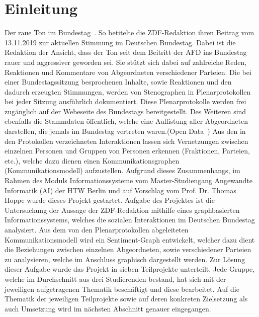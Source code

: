\section{Einleitung}\label{sec:01_01_einleitung}
\glqq Der raue Ton im Bundestag\grqq{}~\cite{TonImBundesTag2019}. So betitelte die ZDF-Redaktion ihren Beitrag vom 13.11.2019 zur aktuellen Stimmung im Deutschen Bundestag. Dabei ist die Redaktion der Ansicht, dass der Ton seit dem Beitritt der AFD ins Bundestag rauer und aggressiver geworden sei. Sie stützt sich dabei auf zahlreiche Reden, Reaktionen und Kommentare von Abgeordneten verschiedener Parteien. Die bei einer Bundestagssitzung besprochenen Inhalte, sowie Reaktionen und den dadurch erzeugten Stimmungen, werden von Stenographen in Plenarprotokollen bei jeder Sitzung ausführlich dokumentiert. Diese Plenarprotokolle werden frei zugänglich auf der Webeseite des Bundestags bereitgestellt. Des Weiteren sind ebenfalls die Stammdaten öffentlich, welche eine Auflistung aller Abgeordneten darstellen, die jemals im Bundestag vertreten waren.(Open Data~\cite{OpenData2019}) Aus den in den Protokollen verzeichneten Interaktionen lassen sich Vernetzungen zwischen einzelnen Personen und Gruppen von Personen erkennen (Fraktionen, Parteien, etc.), welche dazu dienen einen Kommunikationsgraphen (Kommunikationsmodell) aufzustellen. Aufgrund dieses Zusammenhangs, im Rahmen des Moduls Informationssysteme vom Master-Studiengang Angewandte Informatik (AI) der HTW Berlin und auf Vorschlag vom Prof. Dr. Thomas Hoppe wurde dieses Projekt gestartet. Aufgabe des Projektes ist die Untersuchung der Aussage der ZDF-Redaktion mithilfe eines graphbasierten Informationssystems, welches die sozialen Interaktionen im Deutschen Bundestag analysiert. Aus dem von den Plenarprotokollen abgeleiteten Kommunikationsmodell wird ein Sentiment-Graph entwickelt, welcher dazu dient die Beziehungen zwischen einzelnen Abgeordneten, sowie verschiedener Parteien zu analysieren, welche im Anschluss graphisch dargestellt werden. Zur Lösung dieser Aufgabe wurde das Projekt in sieben Teilprojekte unterteilt. Jede Gruppe, welche im Durchschnitt aus drei Studierenden bestand, hat sich mit der jeweiligen aufgetragenen Thematik beschäftigt und diese bearbeitet. Auf die Thematik der jeweiligen Teilprojekte sowie auf deren konkreten Zielsetzung als auch Umsetzung wird im nächsten Abschnitt genauer eingegangen.